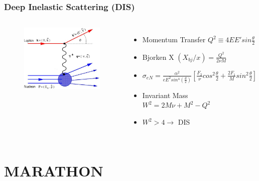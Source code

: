 \documentclass{beamer}
\begin{document}
\begin{frame}
\frametitle{Deep Inelastic Scattering (DIS)}
\begin{columns}[c] %
	
	\begin{figure}
		\includegraphics[width =5cm]{../images/DIS}
	\end{figure}
		
	
	\begin{itemize}
		\item Momentum Transfer $ Q^2 \equiv 4EE' sin \frac{\theta}{2} $
		\item Bjorken X $(X_{bj}/x) = \frac{Q^2}{2\nu M}$
		\item $\sigma_{eN} = \frac{\alpha^2}{eE^2sin^4(\frac{\theta}{2})} [\frac{F_2}{\nu}cos^2\frac{\theta}{2} + \frac{2F_1}{M}sin^2\frac{\theta}{2}] $
		\item Invariant Mass $W^2 = 2M\nu + M^2 - Q^2$
		\item $W^2 > 4 \rightarrow$ DIS
	\end{itemize}
	

	
\end{columns}
\end{frame}

\section[MARATHON]{MARATHON}
\end{document}
